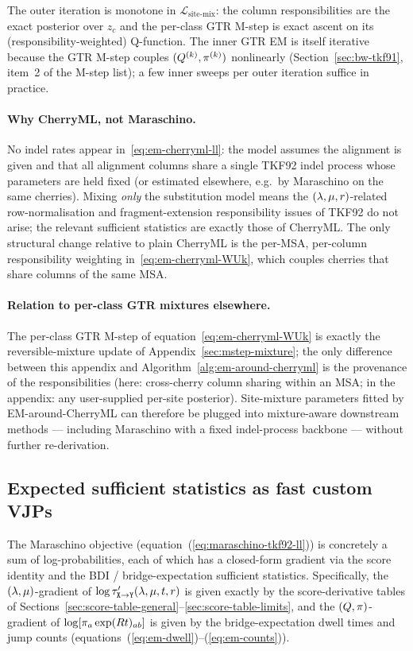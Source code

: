 \noindent
The outer iteration is monotone in
$\mathcal{L}_{\text{site-mix}}$: the column responsibilities are the
exact posterior over $z_c$ and the per-class GTR M-step is exact
ascent on its (responsibility-weighted) Q-function.  The inner GTR
EM is itself iterative because the GTR M-step couples
$(Q^{(k)}, \pi^{(k)})$ nonlinearly
(Section~\ref{sec:bw-tkf91}, item~2 of the M-step list); a few
inner sweeps per outer iteration suffice in practice.

\paragraph{Why CherryML, not Maraschino.}
No indel rates appear in~\eqref{eq:em-cherryml-ll}: the model assumes
the alignment is given and that all alignment columns share a single
TKF92 indel process whose parameters are held fixed (or estimated
elsewhere, e.g.\ by Maraschino on the same cherries).  Mixing
\emph{only} the substitution model means the
$(\lambda, \mu, r)$-related row-normalisation and
fragment-extension responsibility issues of TKF92 do not arise;
the relevant sufficient statistics are exactly those of CherryML.
The only structural change relative to plain CherryML is the per-MSA,
per-column responsibility weighting in~\eqref{eq:em-cherryml-WUk},
which couples cherries that share columns of the same MSA.

\paragraph{Relation to per-class GTR mixtures elsewhere.}
The per-class GTR M-step of equation~\eqref{eq:em-cherryml-WUk} is
exactly the reversible-mixture update of
Appendix~\ref{sec:mstep-mixture}; the only difference between this
appendix and Algorithm~\ref{alg:em-around-cherryml} is the
provenance of the responsibilities (here: cross-cherry column
sharing within an MSA; in the appendix: any user-supplied per-site
posterior).  Site-mixture parameters fitted by
EM-around-CherryML can therefore be plugged into
mixture-aware downstream methods --- including Maraschino with a
fixed indel-process backbone --- without further re-derivation.

\subsection{Expected sufficient statistics as fast custom VJPs}
\label{sec:suffstat-vjp}

The Maraschino objective
(equation~(\ref{eq:maraschino-tkf92-ll})) is concretely a sum of
log-probabilities, each of which has a closed-form gradient via the
score identity and the BDI / bridge-expectation sufficient statistics.
Specifically, the $(\lambda,\mu)$-gradient of
$\log \tau'_{{\tt X}\to{\tt Y}}(\lambda,\mu,t,r)$
is given exactly by the score-derivative tables
of Sections~\ref{sec:score-table-general}--\ref{sec:score-table-limits},
and the $(Q,\pi)$-gradient of
$\log[\pi_a \exp(R t)_{ab}]$ is given by the
bridge-expectation dwell times and jump counts
(equations~(\ref{eq:em-dwell})--(\ref{eq:em-counts})).

